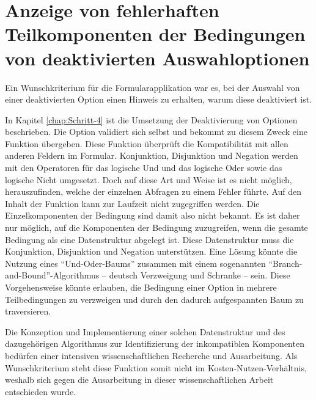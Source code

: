 \section{Anzeige von fehlerhaften Teilkomponenten der Bedingungen von deaktivierten Auswahloptionen}
\label{sec:Anzeige-von-fehlerhaften-Teilkomponenten-der-Bedingungen-von-deaktivierten-Auswahloptionen}


Ein Wunschkriterium für die Formularapplikation war es,
bei der Auswahl von einer deaktivierten Option einen Hinweis zu erhalten,
warum diese deaktiviert ist.

In Kapitel \ref{chap:Schritt-4} ist die Umsetzung der Deaktivierung von Optionen beschrieben.
Die Option validiert sich selbst und bekommt zu diesem Zweck eine Funktion übergeben. Diese Funktion überprüft die Kompatibilität mit allen anderen Feldern im Formular.
Konjunktion, Disjunktion und Negation werden mit den Operatoren für das logische Und und das logische Oder sowie das logische Nicht umgesetzt.
Doch auf diese Art und Weise ist es nicht möglich,
herauszufinden,
welche der einzelnen Abfragen zu einem Fehler führte.
Auf den Inhalt der Funktion kann zur Laufzeit nicht zugegriffen werden.
Die Einzelkomponenten der Bedingung sind damit also nicht bekannt. 
Es ist daher nur möglich,
auf die Komponenten der Bedingung zuzugreifen,
wenn die gesamte Bedingung als eine Datenstruktur abgelegt ist.
Diese Datenstruktur muss die Konjunktion, Disjunktion und Negation unterstützen.
Eine Lösung könnte die Nutzung eines \enquote{Und-Oder-Baums} zusammen mit einem sogenannten \enquote{Branch-and-Bound}-Algorithmus -- deutsch Verzweigung und Schranke -- sein.
Diese Vorgehensweise könnte erlauben, die Bedingung einer Option in mehrere Teilbedingungen zu verzweigen und durch den dadurch aufgespannten Baum zu traversieren.


Die Konzeption und Implementierung einer solchen Datenstruktur und des dazugehörigen Algorithmus zur Identifizierung der inkompatiblen Komponenten bedürfen einer intensiven wissenschaftlichen Recherche und Ausarbeitung.
Als Wunschkriterium steht diese Funktion somit nicht im Kosten-Nutzen-Verhältnis, weshalb sich gegen die Ausarbeitung in dieser wissenschaftlichen Arbeit entschieden wurde.

